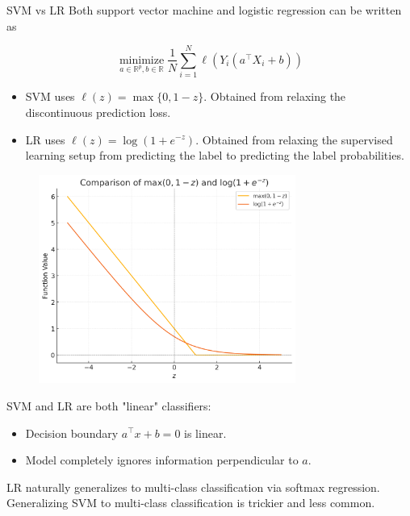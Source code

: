 \begin{frame}[allowframebreaks]

\begin{myconceptblock}{3.15}{SVM vs LR}
    Both support vector machine and logistic regression can be written as

    $$
    \underset{a \in \mathbb{R}^{p}, b \in \mathbb{R}}{\operatorname{minimize}} \frac{1}{N} \sum_{i=1}^{N} \ell\left(Y_{i}\left(a^{\top} X_{i}+b\right)\right)
    $$

    \begin{itemize}
        \item SVM uses $\ell(z)=\max \{0,1-z\}$. Obtained from relaxing the discontinuous prediction loss.
        \item LR uses $\ell(z)=\log \left(1+e^{-z}\right)$. Obtained from relaxing the supervised learning setup from predicting the label to predicting the label probabilities.
    \end{itemize}

    \begin{figure}[H]
        \centering
        \includegraphics[width=0.75\textwidth]{.././assets/3.2.png}
    \end{figure}

    SVM and LR are both "linear" classifiers:

    \begin{itemize}
        \item Decision boundary $a^{\top} x+b=0$ is linear.
        \item Model completely ignores information perpendicular to $a$.
    \end{itemize}

    LR naturally generalizes to multi-class classification via softmax regression. Generalizing SVM to multi-class classification is trickier and less common.
\end{myconceptblock}

\end{frame}

